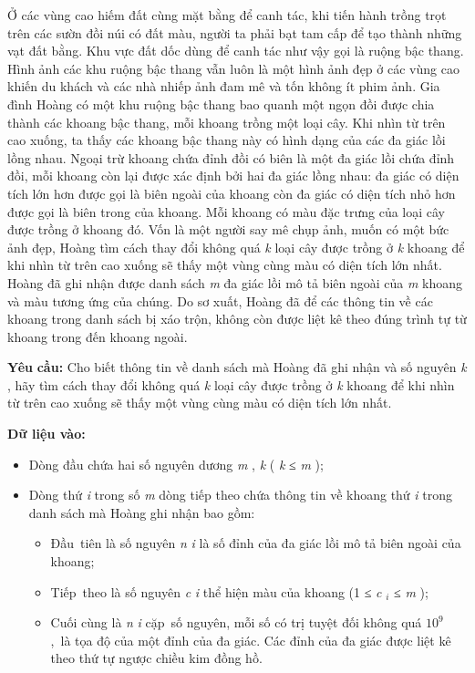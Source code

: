 

Ở các vùng cao hiếm đất cùng mặt bằng để canh tác, khi tiến hành trồng trọt trên các sườn đồi núi có đất màu, người ta phải bạt tam cấp để tạo thành những vạt đất bằng. Khu vực đất dốc dùng để canh tác như vậy gọi là ruộng bậc thang. Hình ảnh các khu ruộng bậc thang vẫn luôn là một hình ảnh đẹp ở các vùng cao khiến du khách và các nhà nhiếp ảnh đam mê và tốn không ít phim ảnh. Gia đình Hoàng có một khu ruộng bậc thang bao quanh một ngọn đồi được chia thành các khoang bậc thang, mỗi khoang trồng một loại cây. Khi nhìn từ trên cao xuống, ta thấy các khoang bậc thang này có hình dạng của các đa giác lồi lồng nhau. Ngoại trừ khoang chứa đỉnh đồi có biên là một đa giác lồi chứa đỉnh đồi, mỗi khoang còn lại được xác định bởi hai đa giác lồng nhau: đa giác có diện tích lớn hơn được gọi là biên ngoài của khoang còn đa giác có diện tích nhỏ hơn được gọi là biên trong của khoang. Mỗi khoang có màu đặc trưng của loại cây được trồng ở khoang đó. Vốn là một người say mê chụp ảnh, muốn có một bức ảnh đẹp, Hoàng tìm cách thay đổi không quá \emph{ k } loại cây được trồng ở \emph{ k } khoang để khi nhìn từ trên cao xuống sẽ thấy một vùng cùng màu có diện tích lớn nhất. Hoàng đã ghi nhận được danh sách \emph{ m } đa giác lồi mô tả biên ngoài của \emph{ m } khoang và màu tương ứng của chúng. Do sơ xuất, Hoàng đã để các thông tin về các khoang trong danh sách bị xáo trộn, không còn được liệt kê theo đúng trình tự từ khoang trong đến khoang ngoài.

\textbf{Yêu }\textbf{}\textbf{ cầu: }\textbf{} Cho biết thông tin về danh sách mà Hoàng đã ghi nhận và số nguyên \emph{ k } , hãy tìm cách thay đổi không quá \emph{ k } loại cây được trồng ở \emph{ k } khoang để khi nhìn từ trên cao xuống sẽ thấy một vùng cùng màu có diện tích lớn nhất.

\textbf{Dữ liệu vào: }
\begin{itemize}
	\item Dòng đầu chứa hai số nguyên dương \emph{ m } , \emph{ k } ( \emph{ k }\emph{} ≤ \emph{ m } );
	\item Dòng thứ \emph{ i } trong số \emph{ m } dòng tiếp theo chứa thông tin về khoang thứ \emph{ i } trong danh sách mà Hoàng ghi nhận bao gồm:
\begin{itemize}
	\item Đầu tiên là số nguyên \emph{ n }\emph{ i } là số đỉnh của đa giác lồi mô tả biên ngoài của khoang;
	\item Tiếp theo là số nguyên \emph{ c }\emph{ i }\emph{} thể hiện màu của khoang (1 ≤ \emph{ c }\emph{$_ i $}\emph{} ≤ \emph{ m } );
	\item Cuối cùng là \emph{ n }\emph{ i } cặp số nguyên, mỗi số có trị tuyệt đối không quá $10^{9}$ , là tọa độ của một đỉnh của đa giác. Các đỉnh của đa giác được liệt kê theo thứ tự ngược chiều kim đồng hồ.
\end{itemize}
\end{itemize}

